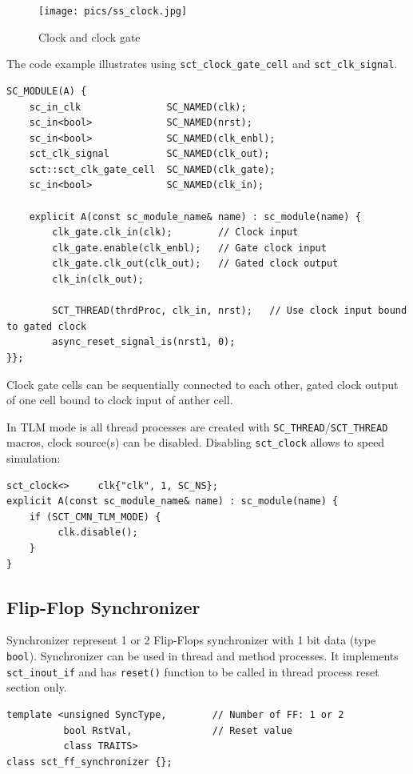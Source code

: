 \begin{figure}[!htb]
\centering
\texttt{[image: pics/ss\_clock.jpg]}
\caption{Clock and clock gate}
\label{fig:ss_clock}
\end{figure}

The code example illustrates using  {\tt sct\_clock\_gate\_cell} and  {\tt sct\_clk\_signal}.

\begin{lstlisting}[style=mycpp]
SC_MODULE(A) {
    sc_in_clk               SC_NAMED(clk);
    sc_in<bool>             SC_NAMED(nrst); 
    sc_in<bool>             SC_NAMED(clk_enbl);
    sct_clk_signal          SC_NAMED(clk_out);
    sct::sct_clk_gate_cell  SC_NAMED(clk_gate);
    sc_in<bool>             SC_NAMED(clk_in);

    explicit A(const sc_module_name& name) : sc_module(name) {
        clk_gate.clk_in(clk);        // Clock input
        clk_gate.enable(clk_enbl);   // Gate clock input 
        clk_gate.clk_out(clk_out);   // Gated clock output    
        clk_in(clk_out);
        
        SCT_THREAD(thrdProc, clk_in, nrst);   // Use clock input bound to gated clock
        async_reset_signal_is(nrst1, 0);
}};
\end{lstlisting}

Clock gate cells can be sequentially connected to each other, gated clock output of one cell bound to clock input of anther cell.

In TLM mode is all thread processes are created with {\tt SC\_THREAD}/{\tt SCT\_THREAD} macros, clock source(s) can be disabled. Disabling {\tt sct\_clock} allows to speed simulation:

\begin{lstlisting}[style=mycpp]
sct_clock<>     clk{"clk", 1, SC_NS};
explicit A(const sc_module_name& name) : sc_module(name) {
    if (SCT_CMN_TLM_MODE) {
         clk.disable();
    }
}
\end{lstlisting}


\ifdefined\INTEL
\subsection{Flip-Flop Synchronizer}
Synchronizer represent 1 or 2 Flip-Flops synchronizer with 1 bit data (type {\tt bool}). Synchronizer can be used in thread and method processes. It implements {\tt sct\_inout\_if} and has {\tt reset()} function to be called in thread process reset section only.

\begin{lstlisting}[style=mycpp]   
template <unsigned SyncType,        // Number of FF: 1 or 2
          bool RstVal,              // Reset value
          class TRAITS>
class sct_ff_synchronizer {};
\end{lstlisting}

